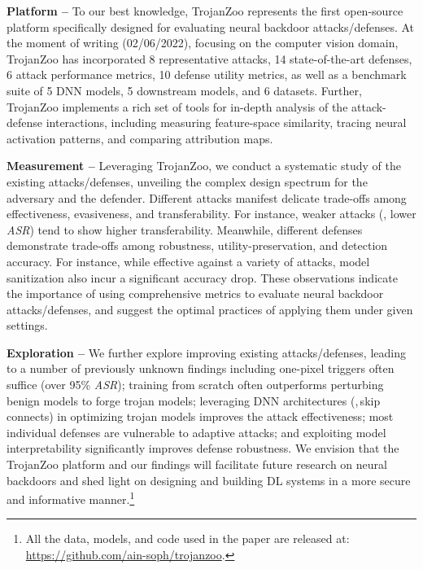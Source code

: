 \documentclass[compsoc,conference,a4paper,10pt,times]{IEEEtran}
\newcommand{\system}{{\sc \small TrojanZoo}\xspace}
\newcommand{\asr}{{\em \small ASR}\xspace}
\begin{document}
\vspace{2pt}
{\bf Platform --} To our best knowledge, \system represents the first open-source platform specifically designed for evaluating neural backdoor attacks/defenses. At the moment of writing (02/06/2022), focusing on the computer vision domain, \system has incorporated 8 representative attacks, 14 state-of-the-art defenses, 6 attack performance metrics, 10 defense utility metrics, as well as a benchmark suite of 5 DNN models, 5 downstream models, and 6 datasets. Further, \system implements a rich set of tools for in-depth analysis of the attack-defense interactions, including measuring feature-space similarity, tracing neural activation patterns, and comparing attribution maps. 


\vspace{2pt}
{\bf Measurement --} Leveraging \system, we conduct a systematic study of the existing attacks/defenses, unveiling the complex design spectrum for the adversary and the defender. Different attacks manifest delicate trade-offs among effectiveness, evasiveness, and transferability. For instance, weaker attacks (\mie, lower \asr) tend to show higher transferability. Meanwhile, different defenses demonstrate trade-offs among robustness, utility-preservation, and detection accuracy. For instance, while effective against a variety of attacks, model sanitization also incur a significant accuracy drop. These observations indicate the importance of using comprehensive metrics to evaluate neural backdoor attacks/defenses, and suggest the optimal practices of applying them under given settings.

\vspace{2pt}
{\bf Exploration --} We further explore improving existing attacks/defenses, leading to a number of previously unknown findings including  one-pixel triggers often suffice (over 95\% \asr);  training from scratch often outperforms perturbing benign models to forge trojan models;  leveraging DNN architectures (\meg,\,skip connects) in optimizing trojan models improves the attack effectiveness;  most individual defenses are vulnerable to adaptive attacks; and  exploiting model interpretability significantly improves defense robustness. We envision that the \system platform and our findings will facilitate future research on neural backdoors and shed light on designing and building DL systems in a more secure and informative manner.\footnote{All the data, models, and code used in the paper are released at:\\ \url{https://github.com/ain-soph/trojanzoo}.}
\end{document}
